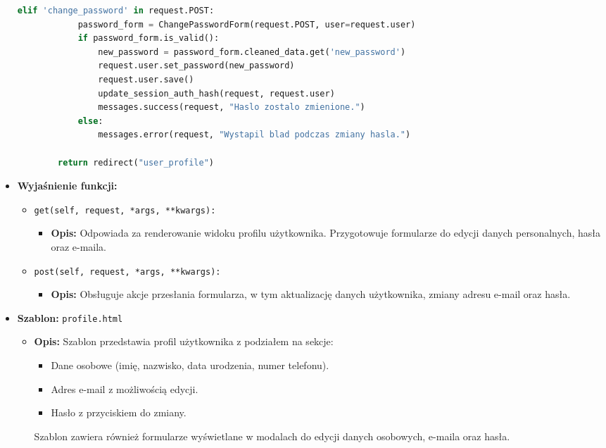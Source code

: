 \documentclass[12pt,a4paper,oneside]{article}
\theoremstyle{definition}
\numberwithin{equation}{section}
\begin{document}
\begin{itemize}
\begin{lstlisting}[language=Python, caption=UserProfileView]
        elif 'change_password' in request.POST:
            password_form = ChangePasswordForm(request.POST, user=request.user)
            if password_form.is_valid():
                new_password = password_form.cleaned_data.get('new_password')
                request.user.set_password(new_password)
                request.user.save()
                update_session_auth_hash(request, request.user)
                messages.success(request, "Haslo zostalo zmienione.")
            else:
                messages.error(request, "Wystapil blad podczas zmiany hasla.")

        return redirect("user_profile")
    \end{lstlisting}

    \item \textbf{Wyjaśnienie funkcji:}
    \begin{itemize}
        \item \texttt{get(self, request, *args, **kwargs):}
        \begin{itemize}
            \item \textbf{Opis:} Odpowiada za renderowanie widoku profilu użytkownika. Przygotowuje formularze do edycji danych personalnych, hasła oraz e-maila.
        \end{itemize}
        \item \texttt{post(self, request, *args, **kwargs):}
        \begin{itemize}
            \item \textbf{Opis:} Obsługuje akcje przesłania formularza, w tym aktualizację danych użytkownika, zmiany adresu e-mail oraz hasła.
        \end{itemize}
    \end{itemize}

    \item \textbf{Szablon:} \texttt{profile.html}
    \begin{itemize}
        \item \textbf{Opis:} Szablon przedstawia profil użytkownika z podziałem na sekcje:
        \begin{itemize}
            \item Dane osobowe (imię, nazwisko, data urodzenia, numer telefonu).
            \item Adres e-mail z możliwością edycji.
            \item Hasło z przyciskiem do zmiany.
        \end{itemize}
        Szablon zawiera również formularze wyświetlane w modalach do edycji danych osobowych, e-maila oraz hasła.
    \end{itemize}
\end{itemize}
\end{document}
